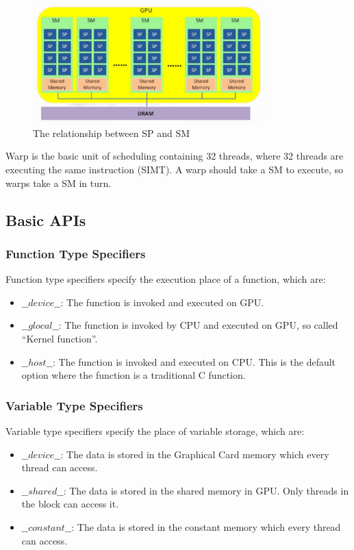\documentclass[11pt]{article}
\begin{document}
\begin{figure}[h]
    \centering
    \includegraphics[width=0.8\textwidth]{spsm.eps}
    \caption{The relationship between SP and SM}
    \label{fig:spsm}
\end{figure}

Warp is the basic unit of scheduling containing 32 threads, where 32 threads are executing the same instruction (SIMT). A warp should take a SM to execute, so warps take a SM in turn.

\subsection{Basic APIs}

\subsubsection{Function Type Specifiers}

Function type specifiers specify the execution place of a function, which are:

\begin{itemize}
\item $\_\_device\_\_$: The function is invoked and executed on GPU.
\item $\_\_glocal\_\_$: The function is invoked by CPU and executed on GPU, so called ``Kernel function''.
\item $\_\_host\_\_$: The function is invoked and executed on CPU. This is the default option where the function is a traditional C function.
\end{itemize}

\subsubsection{Variable Type Specifiers}

Variable type specifiers specify the place of variable storage, which are:

\begin{itemize}
\item $\_\_device\_\_$: The data is stored in the Graphical Card memory which every thread can access.
\item $\_\_shared\_\_$: The data is stored in the shared memory in GPU. Only threads in the block can access it.
\item $\_\_constant\_\_$: The data is stored in the constant memory which every thread can access.
\end{itemize}
\end{document}

